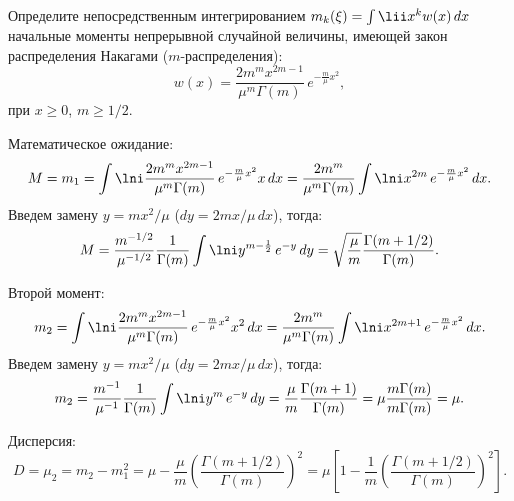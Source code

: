 \documentclass[pscyr]{hedwork}
\begin{document}
  \maketitle

  \begin{task}{6}{
    Определите непосредственным интегрированием
    \( m_k(\xi) = \int\lii x^k w(x)\,dx \) начальные моменты непрерывной
    случайной величины, имеющей закон распределения Накагами
    (\( m \)-распределения):
    \[
      w(x) = \frac{2m^m x^{2m - 1}}{\mu^m\Gamma(m)}\,e^{-\frac{m}{\mu}x^2},
    \]
    при \( x \ge 0 \), \( m \ge 1 / 2 \).
  }

    Математическое ожидание:
    \[
      M = m_1 = \int\lni \frac{2m^m x^{2m - 1}}{\mu^m\Gamma(m)}\,
        e^{-\frac{m}{\mu}x^2} x\,dx = \frac{2m^m}{\mu^m\Gamma(m)}
        \int\lni x^{2m}\,e^{-\frac{m}{\mu}x^2}\,dx.
    \]
    Введем замену \( y = mx^2 / \mu \) (\( dy = 2mx / \mu\,dx \)), тогда:
    \[
      M = \frac{m^{-1/2}}{\mu^{-1/2}}\frac{1}{\Gamma(m)}
        \int\lni y^{m - \frac{1}{2}}\,e^{-y}\,dy =
        \sqrt{\frac{\mu}{m}} \frac{\Gamma(m + 1/2)}{\Gamma(m)}.
    \]

    Второй момент:
    \[
      m_2 = \int\lni \frac{2m^m x^{2m - 1}}{\mu^m\Gamma(m)}\,
        e^{-\frac{m}{\mu}x^2} x^2\,dx = \frac{2m^m}{\mu^m\Gamma(m)}
        \int\lni x^{2m + 1}\,e^{-\frac{m}{\mu}x^2}\,dx.
    \]
    Введем замену \( y = mx^2 / \mu \) (\( dy = 2mx / \mu\,dx \)), тогда:
    \[
      m_2 = \frac{m^{-1}}{\mu^{-1}}\frac{1}{\Gamma(m)}
        \int\lni y^m\,e^{-y}\,dy =
        \frac{\mu}{m} \frac{\Gamma(m + 1)}{\Gamma(m)} =
        \mu\frac{m\Gamma(m)}{m\Gamma(m)} = \mu.
    \]

    Дисперсия:
    \[
      D = \mu_2 = m_2 - m_1^2 = \mu - \frac{\mu}{m}
        \left(\frac{\Gamma(m + 1/2)}{\Gamma(m)}\right)^{\!\!2} =
        \mu\left[1 - \frac{1}{m}
        \left(\frac{\Gamma(m + 1/2)}{\Gamma(m)}\right)^{\!\!2}\right].
    \]
  \end{task}
\end{document}
